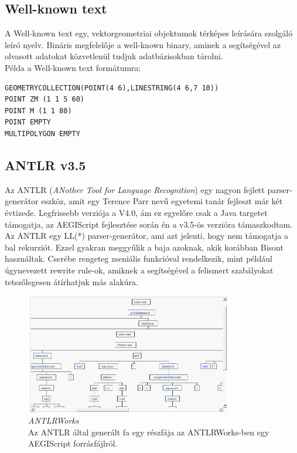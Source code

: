 \documentclass[a4paper,12pt]{report}
\begin{document}

\subsection{Well-known text}

A Well-known text\cite{wkt} egy, vektorgeometriai objektumok térképes leírására szolgáló leíró nyelv. Bináris megfelelője a well-known binary, aminek a segítségével az olvasott adatokat közvetlenül tudjuk adatbázisokban tárolni. \\
Példa a Well-known text formátumra:

\begin{lstlisting}
GEOMETRYCOLLECTION(POINT(4 6),LINESTRING(4 6,7 10))
POINT ZM (1 1 5 60)
POINT M (1 1 80)
POINT EMPTY
MULTIPOLYGON EMPTY
\end{lstlisting}



\subsection{ANTLR v3.5}

Az ANTLR (\textit{ANother Tool for Language Recognition})\cite{antlr} egy nagyon fejlett parser-generátor eszköz, amit egy Terence Parr nevű egyetemi tanár fejleszt már két évtizede. Legfrissebb verziója a V4.0, ám ez egyelőre csak a Java targetet támogatja, az AEGIScript fejlesztése során én a v3.5-ös verzióra támaszkodtam. \\

Az ANTLR egy LL(*) parser-generátor, ami azt jelenti, hogy nem támogatja a bal rekurziót. Ezzel gyakran meggyűlik a baja azoknak, akik korábban Bisont használtak. Cserébe rengeteg zseniális funkcióval rendelkezik, mint például úgynevezett rewrite rule-ok, amiknek a segítségével a felismert szabályokat tetszőlegesen átírhatjuk más alakúra. \\

\begin{figure}[h]
  \caption{\textit{ANTLRWorks} \\ Az ANTLR által generált fa egy részfája az ANTLRWorks-ben egy AEGIScript forrásfájlról.}
  \centering
    \includegraphics[width=0.8\textwidth]{images/parsetree.png}
\end{figure}
\end{document}

